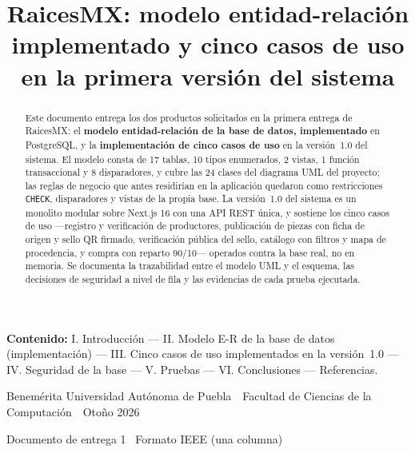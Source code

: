 \documentclass[conference,letterpaper,onecolumn]{IEEEtran}
\newcommand{\Proyecto}{RaicesMX}
\newcommand{\Periodo}{Oto\~no 2026}
\newcommand{\Institucion}{Benem\'erita Universidad Aut\'onoma de Puebla}
\newcommand{\Facultad}{Facultad de Ciencias de la Computaci\'on}
\begin{document}
\vspace{0.3cm}

\begin{center}
\begin{minipage}{0.94\textwidth}
\centering\footnotesize
\textbf{Contenido:} I. Introducción --- II. Modelo E-R de la base de datos
(implementación) --- III. Cinco casos de uso implementados en la versión~1.0 ---
IV. Seguridad de la base --- V. Pruebas --- VI. Conclusiones --- Referencias.
\end{minipage}
\end{center}

\vspace{0.6cm}

\begin{center}
{\color{GrisMedio}\footnotesize
\Institucion\ \textbullet\ \Facultad\ \textbullet\ \Periodo\par}
{\color{VerdeMilpa}\small Documento de entrega 1 \textbullet\ Formato IEEE (una columna)\par}
\end{center}

\noindent{\color{VerdeClaro}\rule{\textwidth}{1.2pt}}\\[-6pt]
\noindent{\color{VerdeMilpa}\rule{\textwidth}{3pt}}

\nopagecolor

\title{\Proyecto: modelo entidad-relación implementado y cinco casos de uso
en la primera versión del sistema}

\author{%
}

\maketitle

\begin{abstract}
\noindent
Este documento entrega los dos productos solicitados en la primera entrega de
\Proyecto: el \textbf{modelo entidad-relación de la base de datos, implementado} en
PostgreSQL, y la \textbf{implementación de cinco casos de uso} en la versión~1.0 del
sistema. El modelo consta de 17 tablas, 10 tipos enumerados, 2 vistas, 1 función
transaccional y 8 disparadores, y cubre las 24 clases del diagrama UML del proyecto;
las reglas de negocio que antes residirían en la aplicación quedaron como
restricciones \texttt{CHECK}, disparadores y vistas de la propia base. La versión~1.0
del sistema es un monolito modular sobre Next.js 16 con una API REST única, y sostiene
los cinco casos de uso ---registro y verificación de productores, publicación de
piezas con ficha de origen y sello QR firmado, verificación pública del sello,
catálogo con filtros y mapa de procedencia, y compra con reparto 90/10--- operados
contra la base real, no en memoria. Se documenta la trazabilidad entre el modelo UML
y el esquema, las decisiones de seguridad a nivel de fila y las evidencias de cada
prueba ejecutada.
\end{abstract}
\end{document}
